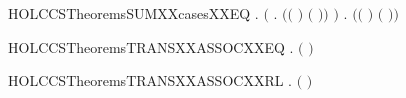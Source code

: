 \newcommand{\HOLCCSTheoremsSUMXXcases}{\UseVerbatim{HOLCCSTheoremsSUMXXcases}}
\begin{SaveVerbatim}{HOLCCSTheoremsSUMXXcasesXXEQ}
\HOLTokenTurnstile{} \HOLSymConst{\HOLTokenForall{}}   .
        \HOLSymConst{\ensuremath{+}}  \HOLTokenTransBegin{}\HOLTokenTransEnd {} \HOLSymConst{\HOLTokenEquiv{}}
       \ensuremath{(}\HOLSymConst{\HOLTokenExists{}} . \ensuremath{(}\ensuremath{(} \HOLSymConst{\ensuremath{=}} \ensuremath{)} \HOLSymConst{\HOLTokenConj{}} \ensuremath{(} \HOLSymConst{\ensuremath{=}} \ensuremath{)}\ensuremath{)} \HOLSymConst{\HOLTokenConj{}}  \HOLTokenTransBegin{}\HOLTokenTransEnd {}\ensuremath{)} \HOLSymConst{\HOLTokenDisj{}}
       \HOLSymConst{\HOLTokenExists{}} . \ensuremath{(}\ensuremath{(} \HOLSymConst{\ensuremath{=}} \ensuremath{)} \HOLSymConst{\HOLTokenConj{}} \ensuremath{(} \HOLSymConst{\ensuremath{=}} \ensuremath{)}\ensuremath{)} \HOLSymConst{\HOLTokenConj{}}  \HOLTokenTransBegin{}\HOLTokenTransEnd {}
\end{SaveVerbatim}
\newcommand{\HOLCCSTheoremsSUMXXcasesXXEQ}{\UseVerbatim{HOLCCSTheoremsSUMXXcasesXXEQ}}
\begin{SaveVerbatim}{HOLCCSTheoremsTRANSXXASSOCXXEQ}
\HOLTokenTurnstile{} \HOLSymConst{\HOLTokenForall{}}    .  \HOLSymConst{\ensuremath{+}}  \HOLSymConst{\ensuremath{+}}  \HOLTokenTransBegin{}\HOLTokenTransEnd {} \HOLSymConst{\HOLTokenEquiv{}}  \HOLSymConst{\ensuremath{+}} \ensuremath{(} \HOLSymConst{\ensuremath{+}} \ensuremath{)} \HOLTokenTransBegin{}\HOLTokenTransEnd {}
\end{SaveVerbatim}
\newcommand{\HOLCCSTheoremsTRANSXXASSOCXXEQ}{\UseVerbatim{HOLCCSTheoremsTRANSXXASSOCXXEQ}}
\begin{SaveVerbatim}{HOLCCSTheoremsTRANSXXASSOCXXRL}
\HOLTokenTurnstile{} \HOLSymConst{\HOLTokenForall{}}    .  \HOLSymConst{\ensuremath{+}} \ensuremath{(} \HOLSymConst{\ensuremath{+}} \ensuremath{)} \HOLTokenTransBegin{}\HOLTokenTransEnd {} \HOLSymConst{\HOLTokenImp{}}  \HOLSymConst{\ensuremath{+}}  \HOLSymConst{\ensuremath{+}}  \HOLTokenTransBegin{}\HOLTokenTransEnd {}
\end{SaveVerbatim}
